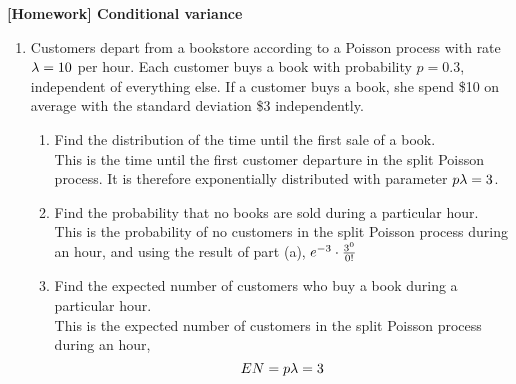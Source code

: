 \documentclass[12pt]{article}%
\newcommand{\0}{{\bf 0}}
\newcommand{\ra}[1]{\renewcommand{\arraystretch}{#1}}
\begin{document}
\newcommand{\ngi}{n \ra \infty}

\pagestyle{myheadings} 

\thispagestyle{plain}


\begin{center}
{\Large\bf [Homework] Conditional variance} 
\end{center}






\begin{enumerate}
\item
Customers depart from a bookstore according to a Poisson process with rate $\lambda=10$ per hour. Each customer buys a book with probability $p=0.3$, independent of everything else.
If a customer buys a book,
she spend \$10 on average with the standard deviation \$3 independently. 
\begin{enumerate}
\item Find the distribution of the time until the first sale of a book.
\\
{\color{blue}{\bf Sol.}}
This is the time until the first customer departure in the split Poisson process. It
is therefore exponentially distributed with parameter $p\lambda=3$.

\item Find the probability that no books are sold during a particular hour.
\\
{\color{blue}{\bf Sol.}}
This is the probability of no customers in the split Poisson process during an hour,
and using the result of part (a), $e^{-3}\cdot \frac{3^0}{0!}$

\item Find the expected number of customers who buy a book during a particular hour.
\\
{\color{blue}{\bf Sol.}}
This is the expected number of customers in the split Poisson process during an
hour, $$EN=p\lambda=3$$




\end{enumerate}
\end{enumerate}
\end{document}
